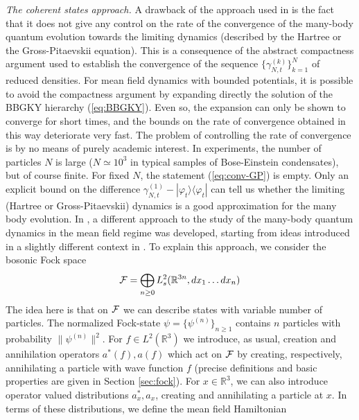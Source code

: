 \documentclass[11pt,a4paper]{article}
\newcommand{\bR}{{\mathbb R}}
\newcommand{\tr}{\mbox{Tr}}
\newcommand{\cF}{{\cal F}}
\begin{document}
\bigskip

{\it The coherent states approach.} A drawback of the approach used in \cite{S,EY,ES,ESY1,ESY2,ESY3,ESY4} is the fact that it does not give any control on the rate of the convergence of the many-body quantum evolution towards the limiting dynamics (described by the Hartree or the Gross-Pitaevskii equation). This is a consequence of the abstract compactness argument used to establish the convergence of the sequence $\{ \gamma^{(k)}_{N,t} \}_{k=1}^N$ of reduced densities. For mean field dynamics with bounded potentials, it is possible to avoid the compactness argument by expanding directly the solution of the BBGKY hierarchy (\ref{eq:BBGKY}).
Even so, the expansion can only be shown to converge for short times, and the bounds on the rate of convergence obtained in this way deteriorate very fast. 
The problem of controlling the rate of convergence is by no means of purely academic interest. In experiments, the number of particles $N$ is large ($N \simeq 10^3$ in typical samples of Bose-Einstein condensates), but of course finite. For fixed $N$, the statement (\ref{eq:conv-GP}) is empty. Only an explicit  bound on the difference $\gamma^{(1)}_{N,t} - |\varphi_t \rangle \langle \varphi_t|$ can tell us whether the limiting (Hartree or Gross-Pitaevskii) dynamics is a good approximation for the many body evolution. In \cite{RS}, a different approach to the study of the many-body quantum dynamics in the mean field regime was developed, starting from ideas introduced in a slightly different context in \cite{H,GV}. 
To explain this approach, we consider the bosonic Fock space 
\[ \cF = \bigoplus_{n \geq 0} L^2_s (\bR^{3n} , dx_1 \dots  dx_n) \]
The idea here is that on $\cF$ we can describe states with variable number of particles. The normalized Fock-state $\psi = \{ \psi^{(n)} \}_{n\geq 1}$ contains $n$ particles with probability $\| \psi^{(n)} \|^2$. For $f \in L^2 (\bR^3)$ we introduce, as usual, creation and annihilation operators $a^* (f), a(f)$ which act on $\cF$ by creating, respectively, annihilating a particle with wave function $f$ (precise definitions and basic properties are given in Section \ref{sec:fock}). For $x \in \bR^3$, we can also introduce operator valued distributions $a_x^*, a_x$, creating and annihilating a particle at $x$. In terms of these distributions, we define the mean field Hamiltonian
\end{document}
